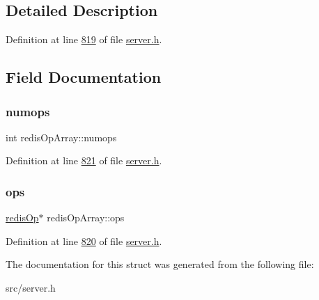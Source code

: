 \subsection{Detailed Description}


Definition at line \hyperlink{server_8h_source_l00819}{819} of file \hyperlink{server_8h_source}{server.\+h}.



\subsection{Field Documentation}
\mbox{\label{structredisOpArray_a1f91aad851c4773626ddb0265e5b0290}} 
\subsubsection{\texorpdfstring{numops}{numops}}
{\footnotesize\ttfamily int redis\+Op\+Array\+::numops}



Definition at line \hyperlink{server_8h_source_l00821}{821} of file \hyperlink{server_8h_source}{server.\+h}.

\mbox{\label{structredisOpArray_a4f2c81d59e63c79fb4fbd515c431b0eb}} 
\subsubsection{\texorpdfstring{ops}{ops}}
{\footnotesize\ttfamily \hyperlink{structredisOp}{redis\+Op}$\ast$ redis\+Op\+Array\+::ops}



Definition at line \hyperlink{server_8h_source_l00820}{820} of file \hyperlink{server_8h_source}{server.\+h}.



The documentation for this struct was generated from the following file\+:\begin{DoxyCompactItemize}
\item 
src/server.\+h\end{DoxyCompactItemize}
